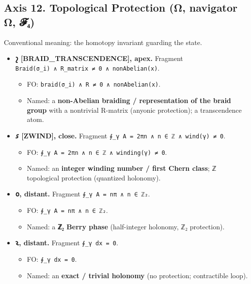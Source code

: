 \documentclass[12pt,a4paper]{article}
\begin{document}
\hypertarget{axis-12.-topological-protection-ux3c9-navigator-ux3c9-ux1d4d5ux2084}{%
\subsection{Axis 12. Topological Protection (Ω, navigator Ω,
𝓕₄)}\label{axis-12.-topological-protection-ux3c9-navigator-ux3c9-ux1d4d5ux2084}}

Conventional meaning: the homotopy invariant guarding the state.

\begin{itemize}
\tightlist
\item
  \textbf{𐑟 {[}BRAID\_TRANSCENDENCE{]}, apex.} Fragment
  \texttt{Braid(σ\_i)\ ∧\ R\_matrix\ ≠\ 0\ ∧\ nonAbelian(x)}.

  \begin{itemize}
  \tightlist
  \item
    FO: \texttt{braid(σ\_i)\ ∧\ R\ ≠\ 0\ ∧\ nonAbelian(x)}.
  \item
    Named: a \textbf{non-Abelian braiding / representation of the braid
    group} with a nontrivial R-matrix (anyonic protection); a
    transcendence atom.
  \end{itemize}
\item
  \textbf{𐑭 {[}ZWIND{]}, close.} Fragment
  \texttt{∮\_γ\ A\ =\ 2πn\ ∧\ n\ ∈\ ℤ\ ∧\ wind(γ)\ ≠\ 0}.

  \begin{itemize}
  \tightlist
  \item
    FO: \texttt{∮\_γ\ A\ =\ 2πn\ ∧\ n\ ∈\ ℤ\ ∧\ winding(γ)\ ≠\ 0}.
  \item
    Named: an \textbf{integer winding number / first Chern class}; ℤ
    topological protection (quantized holonomy).
  \end{itemize}
\item
  \textbf{𐑴, distant.} Fragment \texttt{∮\_γ\ A\ =\ nπ\ ∧\ n\ ∈\ ℤ₂}.

  \begin{itemize}
  \tightlist
  \item
    FO: \texttt{∮\_γ\ A\ =\ nπ\ ∧\ n\ ∈\ ℤ₂}.
  \item
    Named: a \textbf{ℤ₂ Berry phase} (half-integer holonomy, ℤ₂
    protection).
  \end{itemize}
\item
  \textbf{𐑷, distant.} Fragment \texttt{∮\_γ\ dx\ =\ 0}.

  \begin{itemize}
  \tightlist
  \item
    FO: \texttt{∮\_γ\ dx\ =\ 0}.
  \item
    Named: an \textbf{exact / trivial holonomy} (no protection;
    contractible loop).
  \end{itemize}
\end{itemize}
\end{document}
